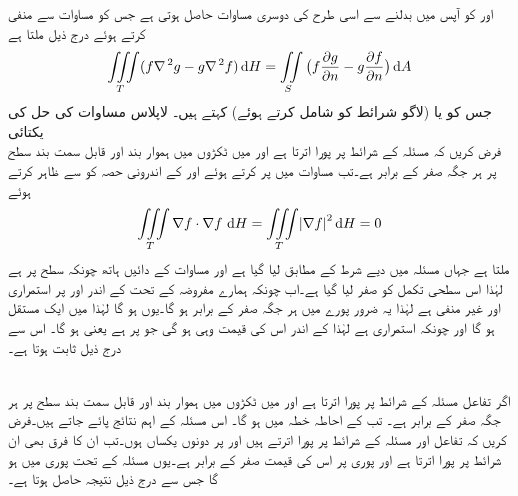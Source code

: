  اور  کو آپس میں بدلنے سے اسی طرح کی دوسری مساوات حاصل ہوتی ہے  جس کو  مساوات  سے منفی کرتے ہوئے درج ذیل ملتا ہے
\begin{align}\label{مساوات_خطی_تکمل_گرین_کلیہ_دوم}
\iiint\limits_T (f\nabla^{\,2}g-g\nabla^{\,2}f)\dif H=\iint\limits_S \big(f\frac{\partial g}{\partial n}-g\frac{\partial f}{\partial n}\big)\dif A
\end{align} 
جس کو  یا (لاگو شرائط کو شامل کرتے ہوئے)  کہتے ہیں۔
\quad لاپلاس مساوات کی حل کی یکتائی\\
فرض کریں کہ  مسئلہ  کے شرائط پر پورا اترتا ہے اور  میں ٹکڑوں میں ہموار بند اور قابل سمت بند سطح  پر ہر جگہ صفر کے برابر ہے۔تب مساوات  میں  پر کرتے ہوئے اور  کے اندرونی حصہ کو  سے ظاہر کرتے ہوئے
\begin{align*}
\iiint\limits_T \nabla f\cdot \nabla f\, \dif H=\iiint\limits_T \abs{\nabla f}^2\dif H=0
\end{align*}
ملتا ہے جہاں مسئلہ  میں دیے شرط کے مطابق  لیا گیا ہے اور مساوات  کے دائیں ہاتھ چونکہ سطح  پر  ہے لہٰذا اس سطحی تکمل کو صفر لیا گیا ہے۔اب چونکہ ہمارے مفروضہ کے تحت   کے اندر  اور  پر  استمراری اور غیر منفی  ہے لہٰذا یہ ضرور پورے  میں  ہر جگہ صفر کے برابر ہو گا۔یوں  ہو گا لہٰذا  میں  ایک مستقل ہو گا اور چونکہ  استمراری ہے لہٰذا  کے اندر اس کی قیمت وہی ہو گی جو  پر ہے یعنی  ہو گا۔
اس سے درج ذیل ثابت ہوتا ہے۔

\\
اگر تفاعل  مسئلہ  کے شرائط پر پورا اترتا ہے اور  میں ٹکڑوں میں ہموار بند اور قابل سمت بند سطح  پر ہر جگہ صفر کے برابر ہے۔ تب  کے احاطہ  خطہ  میں  ہو گا۔
اس مسئلہ کے اہم نتائج پائے جاتے ہیں۔فرض کریں کہ تفاعل  اور  مسئلہ  کے شرائط پر پورا اترتے ہیں اور  پر دونوں یکساں ہوں۔تب ان کا فرق  بھی ان شرائط پر پورا اترتا ہے  اور پوری  پر اس کی قیمت صفر کے برابر ہے۔یوں مسئلہ   کے تحت پوری  میں  ہو گا جس سے درج ذیل نتیجہ حاصل ہوتا ہے۔

